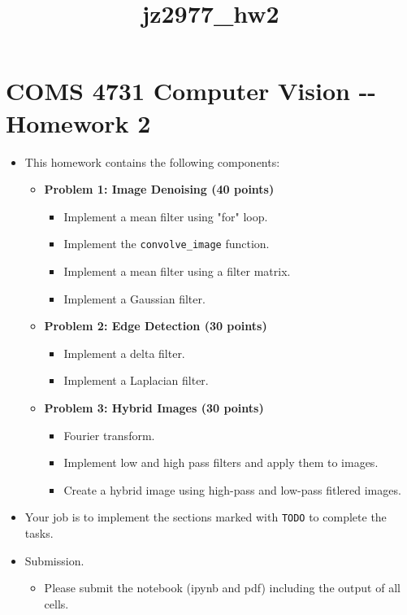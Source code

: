 \documentclass[11pt]{article}
\title{jz2977\_hw2}
\providecommand{\tightlist}{%
      \setlength{\itemsep}{0pt}\setlength{\parskip}{0pt}}
\begin{document}
    
    
    \maketitle
    
    

    
    \section{COMS 4731 Computer Vision -\/- Homework
2}\label{coms-4731-computer-vision----homework-2}

\begin{itemize}
\item
  This homework contains the following components:

  \begin{itemize}
  \tightlist
  \item
    \textbf{Problem 1: Image Denoising (40 points)}

    \begin{itemize}
    \tightlist
    \item
      Implement a mean filter using "for" loop.
    \item
      Implement the \texttt{convolve\_image} function.
    \item
      Implement a mean filter using a filter matrix.
    \item
      Implement a Gaussian filter.
    \end{itemize}
  \item
    \textbf{Problem 2: Edge Detection (30 points)}

    \begin{itemize}
    \tightlist
    \item
      Implement a delta filter.
    \item
      Implement a Laplacian filter.
    \end{itemize}
  \item
    \textbf{Problem 3: Hybrid Images (30 points)}

    \begin{itemize}
    \tightlist
    \item
      Fourier transform.
    \item
      Implement low and high pass filters and apply them to images.
    \item
      Create a hybrid image using high-pass and low-pass fitlered
      images.
    \end{itemize}
  \end{itemize}
\item
  Your job is to implement the sections marked with \texttt{TODO} to
  complete the tasks.
\item
  Submission.

  \begin{itemize}
  \tightlist
  \item
    Please submit the notebook (ipynb and pdf) including the output of
    all cells.
  \end{itemize}
\end{itemize}
\end{document}
